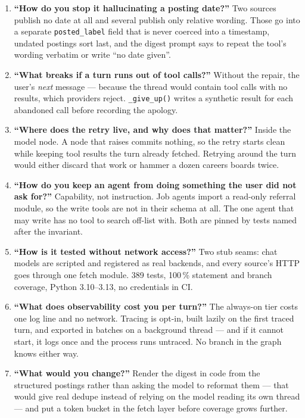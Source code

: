 \documentclass[11pt,a4paper]{article}
\begin{document}
\begin{enumerate}[leftmargin=1.4em,itemsep=5pt]
  \item \textbf{``How do you stop it hallucinating a posting date?''} Two sources publish no
    date at all and several publish only relative wording. Those go into a separate
    \texttt{posted\_\allowbreak{}label} field that is never coerced into a timestamp, undated postings sort
    last, and the digest prompt says to repeat the tool's wording verbatim or write ``no date
    given''.

  \item \textbf{``What breaks if a turn runs out of tool calls?''} Without the repair, the
    user's \emph{next} message --- because the thread would contain tool calls with no
    results, which providers reject. \texttt{\_\allowbreak{}give\_\allowbreak{}up()} writes a synthetic result for each
    abandoned call before recording the apology.

  \item \textbf{``Where does the retry live, and why does that matter?''} Inside the model
    node. A node that raises commits nothing, so the retry starts clean while keeping tool
    results the turn already fetched. Retrying around the turn would either discard that work
    or hammer a dozen careers boards twice.

  \item \textbf{``How do you keep an agent from doing something the user did not ask for?''}
    Capability, not instruction. Job agents import a read-only referral module, so the write
    tools are not in their schema at all. The one agent that may write has no tool to search
    off-list with. Both are pinned by tests named after the invariant.

  \item \textbf{``How is it tested without network access?''} Two stub seams: chat models are
    scripted and registered as real backends, and every source's HTTP goes through one fetch
    module. 389 tests, 100\,\% statement and branch coverage, Python 3.10--3.13, no
    credentials in CI.

  \item \textbf{``What does observability cost you per turn?''} The always-on tier costs one
    log line and no network. Tracing is opt-in, built lazily on the first traced turn, and
    exported in batches on a background thread --- and if it cannot start, it logs once and
    the process runs untraced. No branch in the graph knows either way.

  \item \textbf{``What would you change?''} Render the digest in code from the structured
    postings rather than asking the model to reformat them --- that would give real dedupe
    instead of relying on the model reading its own thread --- and put a token bucket in the
    fetch layer before coverage grows further.
\end{enumerate}
\end{document}
